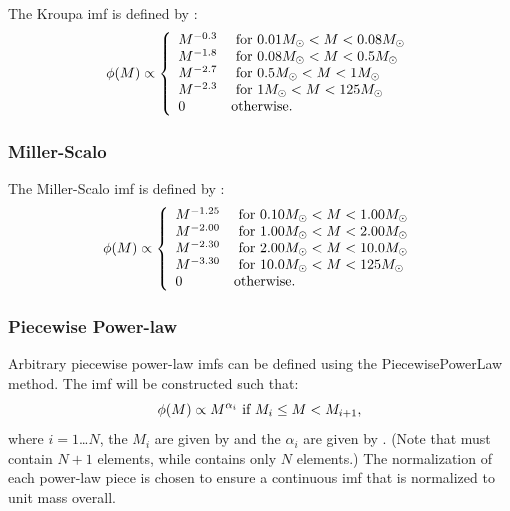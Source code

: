The {\normalfont \ttfamily Kroupa} \gls{imf} is defined by \citep{kroupa_variation_2001}:
\begin{equation}
 \phi(M) \propto \left\{ \begin{array}{ll}
 M^{-0.3} & \hbox{ for } 0.01M_\odot < M < 0.08M_\odot \\ 
 M^{-1.8} & \hbox{ for } 0.08M_\odot < M < 0.5M_\odot \\ 
 M^{-2.7} & \hbox{ for } 0.5M_\odot < M < 1M_\odot \\ 
 M^{-2.3} & \hbox{ for } 1M_\odot < M < 125M_\odot \\ 
0 & \hbox {otherwise.} \end{array} \right.
\end{equation}

\subsubsection{Miller-Scalo}

The {\normalfont \ttfamily Miller-Scalo} \gls{imf} is defined by \citep{miller_initial_1979}:
\begin{equation}
 \phi(M) \propto \left\{ \begin{array}{ll}
 M^{-1.25} & \hbox{ for } 0.10M_\odot < M < 1.00M_\odot \\
 M^{-2.00} & \hbox{ for } 1.00M_\odot < M < 2.00M_\odot \\
 M^{-2.30} & \hbox{ for } 2.00M_\odot < M < 10.0M_\odot \\
 M^{-3.30} & \hbox{ for } 10.0M_\odot < M < 125M_\odot \\
 0 & \hbox {otherwise.} \end{array} \right.
\end{equation}

\subsubsection{Piecewise Power-law}

Arbitrary piecewise power-law {\gls{imf}}s can be defined using the {\normalfont \ttfamily PiecewisePowerLaw} method. The \gls{imf} will be constructed such that:
\begin{equation}
 \phi(M) \propto M^{\alpha_i} \hbox{ if } M_i \le M < M_{i+1},
\end{equation}
where $i=1$\ldots$N$, the $M_i$ are given by {\normalfont \ttfamily [imfPiecewisePowerLawMassPoints]} and the $\alpha_i$ are given by {\normalfont \ttfamily [imfPiecewisePowerLawExponents]}. (Note that {\normalfont \ttfamily [imfPiecewisePowerLawMassPoints]} must contain $N+1$ elements, while {\normalfont \ttfamily [imfPiecewisePowerLawExponents]} contains only $N$ elements.) The normalization of each power-law piece is chosen to ensure a continuous \gls{imf} that is normalized to unit mass overall.

